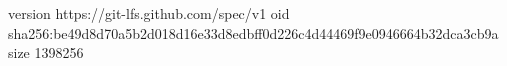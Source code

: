 version https://git-lfs.github.com/spec/v1
oid sha256:be49d8d70a5b2d018d16e33d8edbff0d226c4d44469f9e0946664b32dca3cb9a
size 1398256
